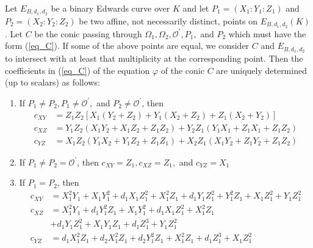 \begin{thm}\label{thm:arene}
Let $E_{B, d_1, d_2}$ be a binary Edwards curve over $K$ and let $P_1 = (X_1 :
    Y_1 : Z_1)$ and $P_2 = (X_2 : Y_2 : Z_2)$ be two affine, not necessarily
    distinct, points on $E_{B, d_1, d_2}(K)$.
Let $C$ be the conic passing through $\Omega_1, \Omega_2, \mathcal{O}^\prime,
    P_1,$ and $P_2$ which must have the form (\ref{eq_C}).
If some of the above points are equal, we consider $C$ and $E_{B, d_1, d_2}$
    to intersect with at least that multiplicity at the corresponding point.
Then the coefficients in (\ref{eq_C}) of the equation $\varphi$ of the conic
    $C$ are uniquely determined (up to scalars) as follows:
\begin{enumerate}
\item
If $P_1 \ne P_2, P_1 \ne \mathcal{O}^\prime,$ and $P_2 \ne \mathcal{O}^\prime$,
    then
\begin{align*}
c_{XY}  &=Z_1Z_2\left[X_1(Y_2 + Z_2) + Y_1(X_2 +Z_2) + Z_1(X_2 + Y_2)\right]\\
c_{XZ}  &=Y_1Z_2(X_1Y_2 + X_1Z_2 + Z_1Z_2) + Y_2Z_1(Y_1X_1 + Z_1X_1 + Z_1Z_2)\\
c_{YZ}  &=X_1Z_2(Y_1X_2 + Y_1Z_2 + Z_1Z_1) + X_2Z_1(X_1Y_2 + Z_1Y_2 + Z_1Z_2)
\end{align*}
\item
If $P_1 \ne P_2 = \mathcal{O}^\prime$, then $c_{XY} = Z_1, c_{XZ} = Z_1,$ and
    $c_{YZ} = X_1 $
\item
If $P_1 = P_2$, then
\begin{align*}
c_{XY}  &=  X_1^2Y_1 + X_1Y_1^2 + d_1X_1Z_1^2 + X_1^2Z_1 + d_1Y_1Z_1^2 +
            Y_1^2Z_1 + X_1Z_1^2 + Y_1Z_1^2\\
c_{XZ}  &=  X_1^2Y_1 + d_1Y_1^2Z_1 + X_1Y_1^2 + d_1X_1Z_1^2 + X_1^2Z_1\\
        &+ d_1Y_1Z_1^2 + X_1Y_1Z_1 + d_1Z_1^3 + Y_1Z_1^2\\
c_{YZ}  &=  d_1X_1^2Z_1 +d_2X_1^2Z_1 + d_2Y_1^2Z_1 + X_1^2Z_1 + d_1Z_1^3 +
            X_1Z_1^2
\end{align*}
\end{enumerate}
\end{thm}


